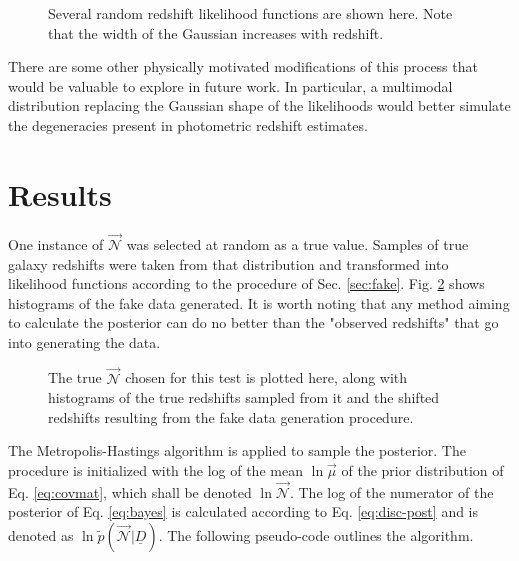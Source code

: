 \documentclass[12pt, onecolumn]{emulateapj}
\newcommand{\textul}{\underline}
\begin{document}
\begin{figure}
\label{fig:pzs}
\caption{Several random redshift likelihood functions are shown here.  Note that the width of the Gaussian increases with redshift.}
\end{figure}

There are some other physically motivated modifications of this process that would be valuable to explore in future work.  In particular, a multimodal distribution replacing the Gaussian shape of the likelihoods would better simulate the degeneracies present in photometric redshift estimates.

\section{Results}

One instance of $\vec{\mathcal{N}}$ was selected at random as a true value.  Samples of true galaxy redshifts were taken from that distribution and transformed into likelihood functions according to the procedure of Sec. \ref{sec:fake}.  Fig. \ref{fig:samples} shows histograms of the fake data generated.  It is worth noting that any method aiming to calculate the posterior can do no better than the "observed redshifts" that go into generating the data.

\begin{figure}
\label{fig:samples}
\caption{The true $\vec{\mathcal{N}}$ chosen for this test is plotted here, along with histograms of the true redshifts sampled from it and the shifted redshifts resulting from the fake data generation procedure.}
\end{figure}

The Metropolis-Hastings algorithm is applied to sample the posterior.  The procedure is initialized with the log of the mean $\ln\vec{\mu}$ of the prior distribution of Eq. \ref{eq:covmat}, which shall be denoted $\ln\vec{\mathcal{N}}$.  The log of the numerator of the posterior of Eq. \ref{eq:bayes} is calculated according to Eq. \ref{eq:disc-post} and is denoted as $\ln\tilde{p}(\vec{\mathcal{N}}|\textul{D})$.  The following pseudo-code outlines the algorithm.
\end{document}
